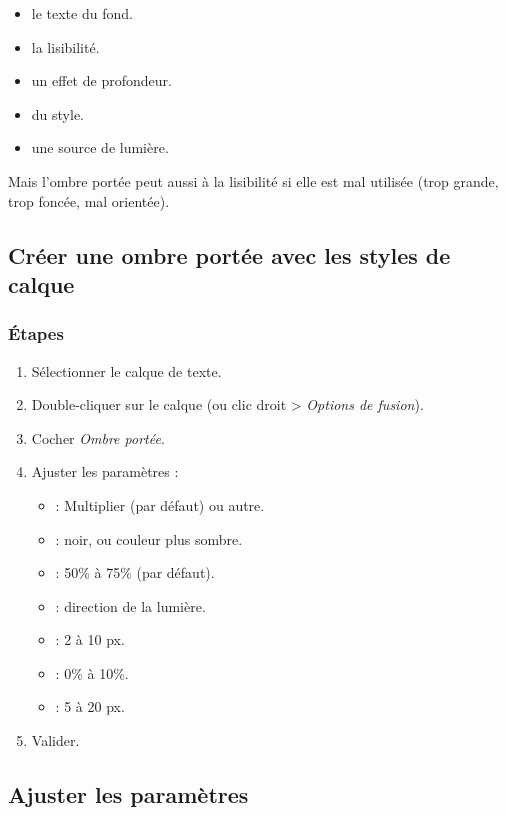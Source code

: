 \begin{itemize}
    \item {} le texte du fond.
    \item {} la lisibilité.
    \item {} un effet de profondeur.
    \item {} du style.
    \item {} une source de lumière.
\end{itemize}

Mais l'ombre portée peut aussi  à la lisibilité si elle est mal utilisée (trop grande, trop foncée, mal orientée).

\subsection{Créer une ombre portée avec les styles de calque}

\subsubsection{Étapes}

\begin{enumerate}
    \item Sélectionner le calque de texte.
    \item Double-cliquer sur le calque (ou clic droit > \emph{Options de fusion}).
    \item Cocher \emph{Ombre portée}.
    \item Ajuster les paramètres :
    \begin{itemize}
        \item {} : Multiplier (par défaut) ou autre.
        \item {} : noir, ou couleur plus sombre.
        \item {} : 50\% à 75\% (par défaut).
        \item {} : direction de la lumière.
        \item {} : 2 à 10 px.
        \item {} : 0\% à 10\%.
        \item {} : 5 à 20 px.
    \end{itemize}
    \item Valider.
\end{enumerate}

\subsection{Ajuster les paramètres}

